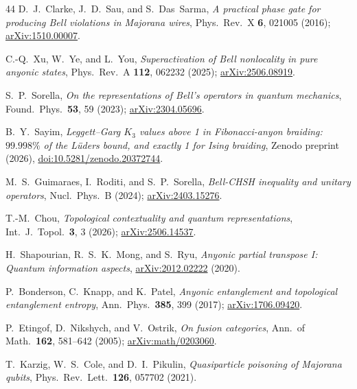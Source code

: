 \documentclass[aps,pra,twocolumn,superscriptaddress,longbibliography,floatfix,nofootinbib]{revtex4-2}
\begin{document}
\begin{thebibliography}{44}
D.~J.~Clarke, J.~D.~Sau, and S.~Das~Sarma,
\emph{A practical phase gate for producing Bell violations in Majorana wires},
Phys.\ Rev.\ X \textbf{6}, 021005 (2016);
\href{https://arxiv.org/abs/1510.00007}{arXiv:1510.00007}.

C.-Q.~Xu, W.~Ye, and L.~You,
\emph{Superactivation of Bell nonlocality in pure anyonic states},
Phys.\ Rev.\ A \textbf{112}, 062232 (2025);
\href{https://arxiv.org/abs/2506.08919}{arXiv:2506.08919}.

S.~P.~Sorella,
\emph{On the representations of Bell's operators in quantum mechanics},
Found.\ Phys.\ \textbf{53}, 59 (2023);
\href{https://arxiv.org/abs/2304.05696}{arXiv:2304.05696}.

B.~Y.~Sayim,
\emph{Leggett--Garg $K_{3}$ values above 1 in Fibonacci-anyon braiding:
$99.998\%$ of the L\"uders bound, and exactly 1 for Ising braiding},
Zenodo preprint (2026),
\href{https://doi.org/10.5281/zenodo.20372744}{doi:10.5281/zenodo.20372744}.


M.~S.~Guimaraes, I.~Roditi, and S.~P.~Sorella,
\emph{Bell-CHSH inequality and unitary operators},
Nucl.\ Phys.\ B (2024);
\href{https://arxiv.org/abs/2403.15276}{arXiv:2403.15276}.

T.-M.~Chou,
\emph{Topological contextuality and quantum representations},
Int.\ J.\ Topol.\ \textbf{3}, 3 (2026);
\href{https://arxiv.org/abs/2506.14537}{arXiv:2506.14537}.

H.~Shapourian, R.~S.~K.~Mong, and S.~Ryu,
\emph{Anyonic partial transpose I: Quantum information aspects},
\href{https://arxiv.org/abs/2012.02222}{arXiv:2012.02222} (2020).

P.~Bonderson, C.~Knapp, and K.~Patel,
\emph{Anyonic entanglement and topological entanglement entropy},
Ann.\ Phys.\ \textbf{385}, 399 (2017);
\href{https://arxiv.org/abs/1706.09420}{arXiv:1706.09420}.

P.~Etingof, D.~Nikshych, and V.~Ostrik,
\emph{On fusion categories},
Ann.\ of Math.\ \textbf{162}, 581--642 (2005);
\href{https://arxiv.org/abs/math/0203060}{arXiv:math/0203060}.

T.~Karzig, W.~S.~Cole, and D.~I.~Pikulin,
\emph{Quasiparticle poisoning of Majorana qubits},
Phys.\ Rev.\ Lett.\ \textbf{126}, 057702 (2021).


\end{thebibliography}
\end{document}
